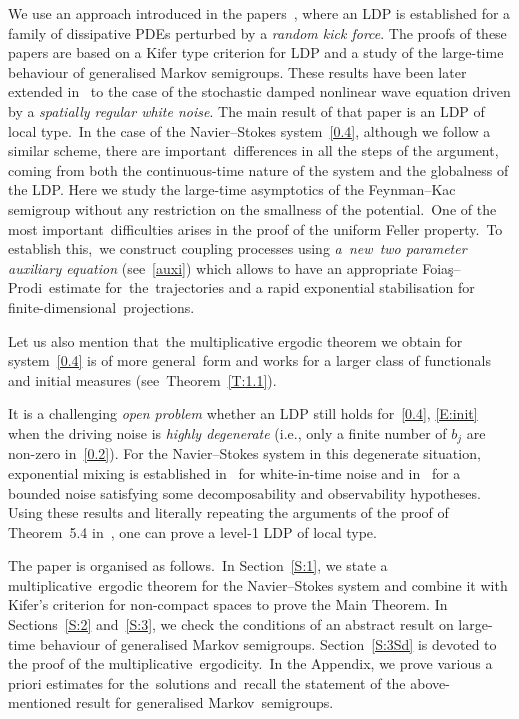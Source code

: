 \documentclass[AHL,Unicode,longabstracts]{cedram}
\begin{document}
We use an approach introduced in the papers~\cite{JNPS-2012, JNPS-2014}, where an LDP is established for a family of dissipative PDEs perturbed by a \emph{random kick force}. The proofs of these papers are based on a Kifer type criterion for LDP and a study of the large-time behaviour of generalised Markov semigroups. These results have been later extended in~\cite{MN-2015} to the case of the stochastic damped nonlinear wave equation driven by a \emph{spatially regular white noise}. The main result of that paper is an LDP of local type.~In the case of the Navier--Stokes system~\eqref{0.4}, although we follow a similar scheme, there are important~differences in all the steps of the argument, coming from both the continuous-time nature of the system and the globalness of the LDP. Here we study the large-time asymptotics of the Feynman--Kac semigroup without any restriction on the smallness of the potential.~One of the most important~difficulties arises in the proof of the uniform Feller property.~To establish this,~we construct coupling processes using \emph{a~new~two parameter auxiliary equation} (see~\eqref{auxi}) which allows to have an appropriate Foia\c{s}--Prodi~estimate for~the~trajectories and a rapid exponential stabilisation for finite-dimensional~projections.


Let us also mention that~the multiplicative ergodic theorem we obtain for system~\eqref{0.4} is of more general~form and works for a larger class of functionals and initial measures (see~Theorem~\ref{T:1.1}).

It is a challenging \emph{open problem} whether an LDP still holds for~\eqref{0.4}, \eqref{E:init} when the driving noise is \emph{highly degenerate} (i.e., only a finite number of $b_j$ are non-zero in~\eqref{0.2}). For the Navier--Stokes system in this degenerate situation, exponential mixing is established in~\cite{HM-2006} for white-in-time noise and in~\cite{KNS-2018} for a bounded noise satisfying some decomposability and observability hypotheses. Using these results and literally repeating the arguments of the proof of Theorem~5.4 in~\cite{MN-2017}, one can prove a level-1 LDP of local type.

The paper is organised as follows.~In Section~\ref{S:1}, we state a multiplicative~ergodic theorem for the Navier--Stokes system and combine it with Kifer's criterion for non-compact spaces to prove the Main Theorem. In Sections~\ref{S:2} and~\ref{S:3}, we check the conditions of an abstract result on large-time behaviour of generalised Markov semigroups. Section~\ref{S:3Sd} is devoted to the proof of the multiplicative~ergodicity.~In the Appendix, we prove various a priori estimates for the~solutions and~recall the statement of the above-mentioned result for generalised Markov~semigroups.
\end{document}
